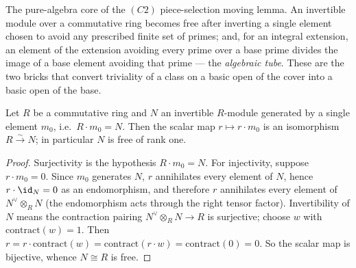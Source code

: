 The pure-algebra core of the \((C2)\) piece-selection moving lemma. An invertible module over a
commutative ring becomes free after inverting a single element chosen to avoid any prescribed finite
set of primes; and, for an integral extension, an element of the extension avoiding every prime over
a base prime divides the image of a base element avoiding that prime --- the \emph{algebraic tube}.
These are the two bricks that convert triviality of a class on a basic open of the cover into a
basic open of the base.

\begin{lemma}
  \label{lem:invertible_cyclic_free}
  \leanok
  Let \(R\) be a commutative ring and \(N\) an invertible \(R\)-module generated by a single element
  \(m_0\), i.e.\ \(R \cdot m_0 = N\). Then the scalar map \(r \mapsto r \cdot m_0\) is an isomorphism
  \(R \xrightarrow{\sim} N\); in particular \(N\) is free of rank one.
\end{lemma}
\begin{proof}
  \leanok
  Surjectivity is the hypothesis \(R \cdot m_0 = N\). For injectivity, suppose \(r \cdot m_0 = 0\).
  Since \(m_0\) generates \(N\), \(r\) annihilates every element of \(N\), hence \(r \cdot \id_N = 0\)
  as an endomorphism, and therefore \(r\) annihilates every element of \(N^{\vee} \otimes_R N\) (the
  endomorphism acts through the right tensor factor). Invertibility of \(N\) means the contraction
  pairing \(N^{\vee} \otimes_R N \to R\) is surjective; choose \(w\) with \(\mathrm{contract}(w) = 1\).
  Then \(r = r \cdot \mathrm{contract}(w) = \mathrm{contract}(r \cdot w) = \mathrm{contract}(0) = 0\).
  So the scalar map is bijective, whence \(N \cong R\) is free.
\end{proof}

